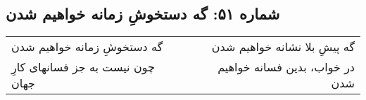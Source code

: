 \begin{center}
\section*{شماره ۵۱: گه دستخوشِ زمانه خواهیم شدن}
\label{sec:051}
\begin{longtable}{l p{0.5cm} r}
گه دستخوشِ زمانه خواهیم شدن
&&
گه پیشِ بلا نشانه خواهیم شدن
\\
چون نیست به جز فسانهای کارِ جهان
&&
در خواب، بدین فسانه خواهیم شدن
\\
\end{longtable}
\end{center}
